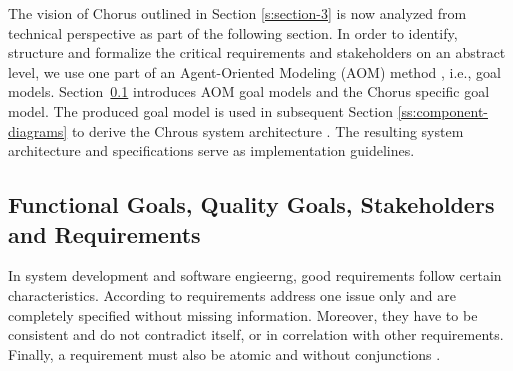 \documentclass{llncs}
\begin{document}
{		The vision of Chorus outlined in Section \ref{s:section-3} is now analyzed from technical perspective as part of the following section. In order to identify, structure and formalize the critical requirements and stakeholders on an abstract level, we use one part of an Agent-Oriented Modeling (AOM) method \cite{sterling2009art}, i.e., goal models. Section~\ref{ss:requirement-engineering} introduces AOM goal models and the Chorus specific goal model. The produced goal model is used in subsequent Section \ref{ss:component-diagrams} to derive the Chrous system architecture . The resulting system architecture and specifications serve as implementation guidelines. 
		
		
		
		\subsection{Functional Goals, Quality Goals, Stakeholders and Requirements}
			\label{ss:requirement-engineering}
						
			In system development and software engieerng, good requirements follow certain characteristics. According to \cite{davis1993software}\cite{ieee1994ieee} requirements address one issue only and are completely specified without missing information. Moreover, they have to be consistent and do not contradict itself, or in correlation with other requirements. Finally, a requirement must also be atomic and without conjunctions \cite{norta2014reference}.

}
\end{document}
